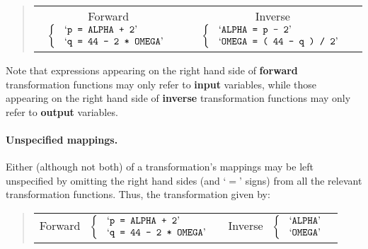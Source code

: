 \begin{quote}
\begin{center}
\begin{tabular}{cc}

\mbox{Forward } $\left\{ \mbox{
\begin{tabular}{l}
`{\tt p = ALPHA + 2}' \\
`{\tt q = 44 - 2 * OMEGA}' \\
\end{tabular}
}\right.$
&
\mbox{Inverse } $\left\{ \mbox{
\begin{tabular}{l}
`{\tt ALPHA = p - 2}' \\
`{\tt OMEGA = ( 44 - q ) / 2}'
\end{tabular}
}\right.$

\end{tabular}
\end{center}
\end{quote}

Note that expressions appearing on the right hand side of {\bf forward}
transformation functions may only refer to {\bf input} variables, while
those appearing on the right hand side of {\bf inverse} transformation
functions may only refer to {\bf output} variables. 

\paragraph{Unspecified mappings.}
Either (although not both) of a transformation's mappings may be left
unspecified by omitting the right hand sides (and `$=$' signs) from all the
relevant transformation functions. 
Thus, the transformation given by:

\begin{quote}
\begin{center}
\begin{tabular}{cc}

\mbox{Forward } $\left\{ \mbox{
\begin{tabular}{l}
`{\tt p = ALPHA + 2}' \\
`{\tt q = 44 - 2 * OMEGA}' \\
\end{tabular}
}\right.$
&
\mbox{Inverse } $\left\{ \mbox{
\begin{tabular}{l}
`{\tt ALPHA}' \\
`{\tt OMEGA}'
\end{tabular}
}\right.$

\end{tabular}
\end{center}
\end{quote}

